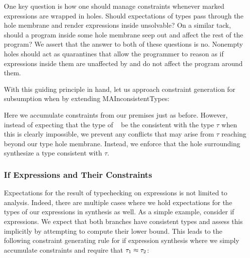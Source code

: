 One key question is how one should manage constraints whenever marked expressions are wrapped in holes. Should expectations of types pass through the hole membrane and render expressions inside unsolvable? On a similar tack, should a program inside some hole membrane seep out and affect the rest of the program? We assert that the answer to both of these questions is no. Nonempty holes should act as quarantines that allow the programmer to reason as if expressions inside them are unaffected by and do not affect the program around them.

With this guiding principle in hand, let us approach constraint generation for subsumption when  by extending MAInconsistentTypes:

\begin{mathpar}
\end{mathpar}

Here we accumulate constraints from our premises just as before. However, instead of expecting that the type of \ECMV~ be the consistent with the type $\tau$ when this is clearly impossible, we prevent any conflicts that may arise from $\tau$ reaching beyond our type hole membrane. Instead, we enforce that the hole surrounding \ECMV~ synthesize a type consistent with $\tau$.

\subsubsection{If Expressions and Their Constraints}
Expectations for the result of typechecking on expressions is not limited to analysis. Indeed, there are multiple cases where we hold expectations for the types of our expressions in synthesis as well. As a simple example, consider if expressions. We expect that both branches have consistent types and assess this implicitly by attempting to compute their lower bound. This leads to the following constraint generating rule for if expression synthesis where we simply accumulate constraints and require that $\TMV_1 \approx \TMV_2$:

\begin{mathpar}
\end{mathpar} 

